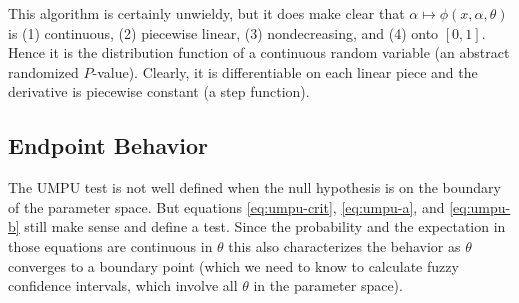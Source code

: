 \documentclass{article}
\begin{document}
This algorithm is certainly unwieldy, but it does make clear that
$\alpha \mapsto \phi(x, \alpha, \theta)$ is (1) continuous, (2) piecewise
linear, (3) nondecreasing, and (4) onto $[0, 1]$.
Hence it is the distribution function of a continuous
random variable (an abstract randomized $P$-value).
Clearly, it is differentiable on
each linear piece and the derivative is piecewise constant (a step function).

\subsection{Endpoint Behavior} \label{sec:endpoint}

The UMPU test is not well defined when the null hypothesis is on
the boundary of the parameter space.  But equations \eqref{eq:umpu-crit},
\eqref{eq:umpu-a},
and \eqref{eq:umpu-b} still make sense and define a test.  Since
the probability and the expectation in those equations are continuous
in $\theta$ this also characterizes the behavior as $\theta$ converges
to a boundary point (which we need to know to calculate fuzzy confidence
intervals, which involve all $\theta$ in the parameter space).
\end{document}
